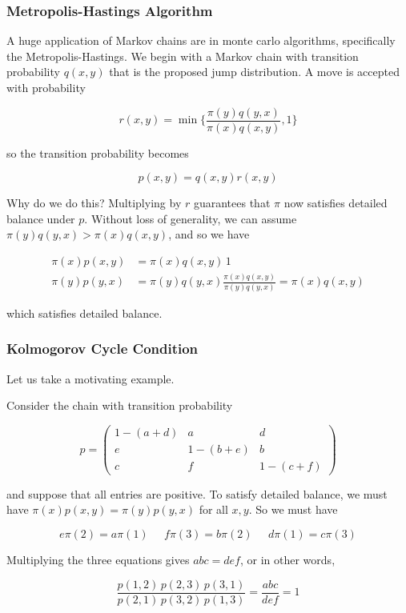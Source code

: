 \documentclass{article}
\begin{document}
    \subsubsection{Metropolis-Hastings Algorithm}

      A huge application of Markov chains are in monte carlo algorithms, specifically the Metropolis-Hastings. We begin with a Markov chain with transition probability $q(x, y)$ that is the proposed jump distribution. A move is accepted with probability 

        \[r(x, y) = \min\bigg\{ \frac{\pi(y) q(y, x)}{\pi(x) q(x, y)}, 1 \bigg\}\]

      so the transition probability becomes 

        \[p(x, y) = q(x, y) r(x, y)\]

      Why do we do this? Multiplying by $r$ guarantees that $\pi$ now satisfies detailed balance under $p$. Without loss of generality, we can assume $\pi(y) q(y, x) > \pi(x) q(x, y)$, and so we have 

      \begin{align*}
        \pi(x) p(x, y) & = \pi(x) q(x, y) \,1 \\
        \pi(y) p(y, x) & = \pi(y) q(y, x) \frac{\pi(x) q(x, y)}{\pi(y) q(y, x)} = \pi(x) q(x, y)
      \end{align*}

      which satisfies detailed balance. 

    \subsubsection{Kolmogorov Cycle Condition}

      Let us take a motivating example. 

      \begin{example}
        Consider the chain with transition probability 

          \[p = \begin{pmatrix} 1 - (a + d) & a & d \\ e & 1 - (b + e) & b \\ c & f & 1 - (c + f) \end{pmatrix}\]

        and suppose that all entries are positive. To satisfy detailed balance, we must have $\pi(x) p(x, y) = \pi(y) p(y, x)$ for all $x, y$. So we must have

          \[e \pi(2) = a \pi(1) \;\;\;\;\; f \pi(3) = b \pi(2) \;\;\;\;\; d \pi(1) = c \pi(3)\]

        Multiplying the three equations gives $abc = def$, or in other words, 

          \[\frac{p(1, 2) \, p(2, 3) \, p(3, 1)}{p(2, 1)\, p(3, 2) \, p(1, 3)} = \frac{abc}{def} = 1\]
      \end{example}
\end{document}
